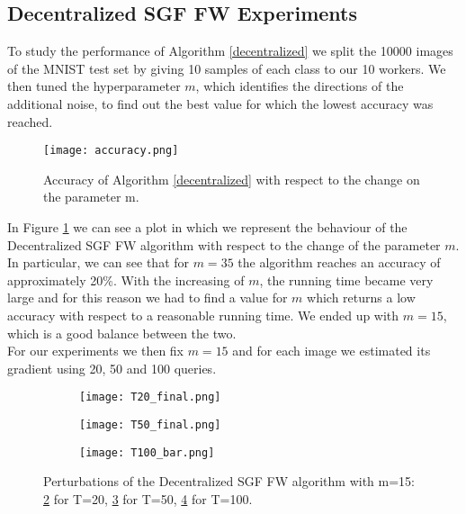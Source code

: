 \subsection{Decentralized SGF FW Experiments}
To study the performance of Algorithm \ref{decentralized} we split the 10000 images of the MNIST test set by giving 10 samples of each class to our 10 workers.
We then tuned the hyperparameter $m$, which identifies the directions of the additional noise, to find out the best value for which the lowest accuracy was reached.
\begin{figure}[htbp]
	\centering
	\texttt{[image: accuracy.png]}
	\caption{{\small Accuracy of Algorithm \ref{decentralized} with respect to the change on the parameter m.}}
	\label{fig:accuracy}
\end{figure}
In Figure \ref{fig:accuracy} we can see a plot in which we represent the behaviour of the Decentralized SGF FW algorithm  with respect to the change of the parameter $m$. In particular, we can see that for $m=35$ the algorithm reaches an accuracy of approximately 20\%. With the increasing of $m$, the running time became very large and for this reason we had to find a value for $m$ which returns a low accuracy with respect to a reasonable running time. We ended up with $m=15$, which is a good balance between the two.\\
For our experiments we then fix $m=15$ and for each image we estimated its gradient using 20, 50 and 100 queries.

\begin{figure}[h]
	\centering
	\begin{subfigure}[b]{0.15\textwidth}
		\centering
		\texttt{[image: T20\_final.png]}
		\caption{}
		\label{fig:decentralized_perturbation_20}
	\end{subfigure}
	\hfill
	\begin{subfigure}[b]{0.15\textwidth}
		\texttt{[image: T50\_final.png]}
		\caption{}
		\label{fig:decentralized_perturbation_50}
	\end{subfigure}
	\hfill
	\begin{subfigure}[b]{0.15\textwidth}
		\texttt{[image: T100\_bar.png]}
		\caption{}
		\label{fig:decentralized_perturbation_100}
	\end{subfigure}
	\caption{{\small Perturbations of the Decentralized SGF FW algorithm with m=15: \ref{fig:decentralized_perturbation_20} for T=20, \ref{fig:decentralized_perturbation_50} for T=50,  \ref{fig:decentralized_perturbation_100} for T=100.}}
	\label{fig:decentralized_perturbations}
\end{figure}

